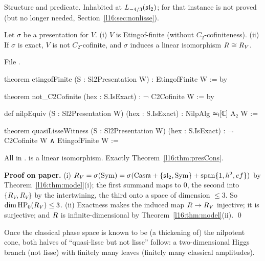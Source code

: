 \begin{status}
Structure and predicate. Inhabited at $L_{-4/3}(\mathfrak{sl}_2)$;  for that instance is not proved (but no longer
needed, Section~\ref{l16:sec:nonlisse}).
\end{status}

\begin{theorem}\label{l16:thm:presCons}
Let $\sigma$ be a presentation for $V$. (i) $V$ is Etingof-finite (without $C_2$-cofiniteness). (ii) If $\sigma$ is exact,
$V$ is not $C_2$-cofinite, and $\sigma$ induces a linear isomorphism $R\cong R_V$.
\end{theorem}
\noindent File .
\begin{leancode}
theorem etingofFinite (S : Sl2Presentation W) : EtingofFinite W := by

theorem not_C2Cofinite (hex : S.IsExact) : ¬ C2Cofinite W := by

def nilpEquiv (S : Sl2Presentation W) (hex : S.IsExact) : NilpAlg ≃ₗ[ℂ] A₂ W :=

theorem quasiLisseWitness (S : Sl2Presentation W) (hex : S.IsExact) :
    ¬ C2Cofinite W ∧ EtingofFinite W :=
\end{leancode}

\begin{dictionary}
All in \allowbreak{}\allowbreak{}.  is a linear isomorphism. Exactly
Theorem~\ref{l16:thm:presCons}.
\end{dictionary}

\textbf{Proof on paper.} (i) $R_V = \sigma(\operatorname{Sym}) = \sigma(\mathrm{Cas}\mathfrak m + \{\mathfrak{sl}_2,\operatorname{Sym}\}
+ \operatorname{span}\{1,h^2,ef\})$ by Theorem~\ref{l16:thm:model}(i); the first summand maps to $0$, the second into
$\{R_V,R_V\}$ by the intertwining, the third onto a space of dimension $\le3$. So $\dim\mathrm{HP}_0(R_V)\le3$. (ii) Exactness
makes the induced map $R\to R_V$ injective; it is surjective; and $R$ is infinite-dimensional by
Theorem~\ref{l16:thm:model}(ii). \qed

\begin{physics}
Once the classical phase space is known to be (a thickening of) the nilpotent cone, both halves of ``quasi-lisse but not
lisse'' follow: a two-dimensional Higgs branch (not lisse) with finitely many leaves (finitely many classical amplitudes).
\end{physics}

